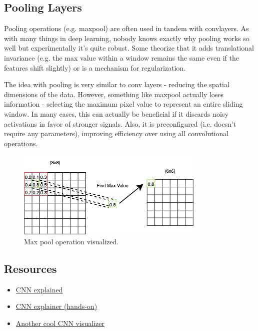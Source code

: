 \documentclass[12pt]{article}
\begin{document}
\subsection{Pooling Layers}

Pooling operations (e.g. maxpool) are often used in tandem with convlayers. As with many things in deep learning, nobody knows exactly why pooling works so well but experimentally it's quite robust. Some theorize that it adds translational invariance (e.g. the max value within a window remains the same even if the features shift slightly) or is a mechanism for regularization.

The idea with pooling is very similar to conv layers - reducing the spatial dimensions of the data. However, something like maxpool actually loses information - selecting the maximum pixel value to represent an entire sliding window. In many cases, this can actually be beneficial if it discards noisy activations in favor of stronger signals. Also, it is preconfigured (i.e. doesn't require any parameters), improving efficiency over using all convolutional operations.
\begin{figure}[H]
    \centering
    \includegraphics[width=0.8\textwidth]{../media/pooling.png}
    \caption{Max pool operation visualized. }
    \label{fig:pooling}
\end{figure}

\subsection{Resources}
\begin{itemize}
  \item \href{https://towardsdatascience.com/convolutional-neural-networks-explained-9cc5188c4939/}{CNN explained}  
  \item \href{https://poloclub.github.io/cnn-explainer/}{CNN explainer (hands-on)}
  \item \href{https://adamharley.com/nn_vis/cnn/3d.html}{Another cool CNN visualizer}
\end{itemize}
\end{document}
